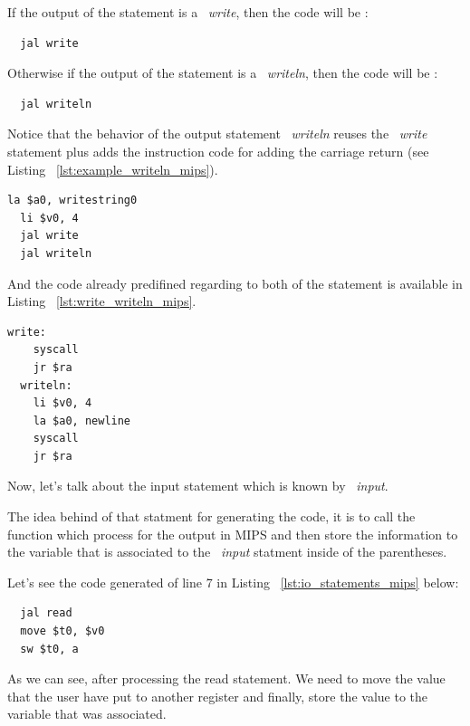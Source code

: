 \documentclass[
  oneside,
  11pt, a4paper,
  footinclude=true,
  headinclude=true,
  cleardoublepage=empty
]{scrbook}
\begin{document}
If the output of the statement is a ~\textit{write}, then the code will be :

\begin{lstlisting}
  jal write
\end{lstlisting}

Otherwise if the output of the statement is a ~\textit{writeln}, then the code will be :

\begin{lstlisting}	
  jal writeln
\end{lstlisting}

Notice that the behavior of the output statement ~\textit{writeln} reuses the ~\textit{write} statement plus adds the instruction code for adding the carriage return (see Listing ~\ref{lst:example_writeln_mips}).

\begin{lstlisting}[caption={Code generated for line 6 in Listing ~\ref{lst:io_statements_mips}},label={lst:example_writeln_mips}]
  la $a0, writestring0
  li $v0, 4
  jal write	
  jal writeln
\end{lstlisting}

And the code already predifined regarding to both of the statement is available in Listing ~\ref{lst:write_writeln_mips}.

\begin{lstlisting}[caption={MIPS assembly code of write and writeln},label={lst:write_writeln_mips}]
  write: 
	syscall
	jr $ra
  writeln: 
	li $v0, 4
	la $a0, newline
	syscall
	jr $ra
\end{lstlisting}

Now, let's talk about the input statement which is known by ~\textit{input}.

The idea behind of that statment for generating the code, it is to call the function which process for the output in MIPS and then store the information to the variable that is associated to the ~\textit{input} statment inside of the parentheses.

Let's see the code generated of line 7 in Listing ~\ref{lst:io_statements_mips} below:

\begin{lstlisting}
  jal read		
  move $t0, $v0		
  sw $t0, a		
\end{lstlisting}

As we can see, after processing the read statement. We need to move the value that the user have put to another register and finally, store the value to the variable that was associated.
\end{document}
